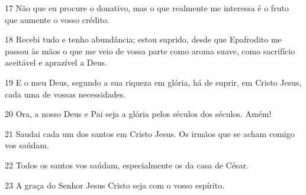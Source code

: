 \par 17 Não que eu procure o donativo, mas o que realmente me interessa é o fruto que aumente o vosso crédito.
\par 18 Recebi tudo e tenho abundância; estou suprido, desde que Epafrodito me passou às mãos o que me veio de vossa parte como aroma suave, como sacrifício aceitável e aprazível a Deus.
\par 19 E o meu Deus, segundo a sua riqueza em glória, há de suprir, em Cristo Jesus, cada uma de vossas necessidades.
\par 20 Ora, a nosso Deus e Pai seja a glória pelos séculos dos séculos. Amém!
\par 21 Saudai cada um dos santos em Cristo Jesus. Os irmãos que se acham comigo vos saúdam.
\par 22 Todos os santos vos saúdam, especialmente os da casa de César.
\par 23 A graça do Senhor Jesus Cristo seja com o vosso espírito.


